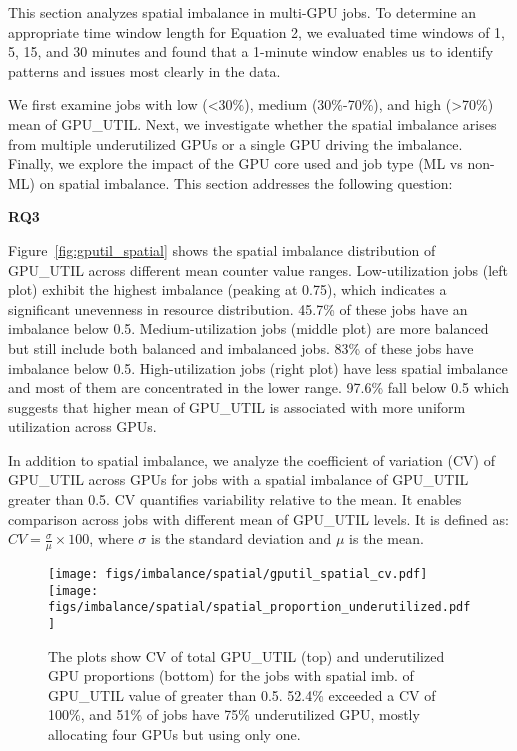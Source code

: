 This section analyzes spatial imbalance in multi-GPU jobs.
To determine an appropriate time window length for Equation 2, we evaluated
time windows of 1, 5, 15, and 30 minutes and found that a 1-minute window
enables us to identify patterns and issues most clearly in the data.

We first examine jobs with low (\textless30\%), medium (30\%-70\%), and
high (\textgreater70\%) mean of GPU\_UTIL. Next, we investigate
whether the spatial imbalance arises from multiple underutilized GPUs or a
single GPU driving the imbalance. Finally, we explore the impact of the GPU core used
and job type (ML vs non-ML) on spatial imbalance. This section addresses
the following question:
%
\begin{RQcallout}
    {\bf RQ3 }{\it \RQthree{}}
\end{RQcallout}

Figure~\ref{fig:gputil_spatial} shows the spatial imbalance distribution of
GPU\_UTIL across different mean counter value ranges. Low-utilization jobs
(left plot) exhibit the highest imbalance (peaking at 0.75),
which indicates a significant unevenness in resource distribution. 45.7\% of these
jobs have an imbalance below 0.5. Medium-utilization jobs (middle plot)  are more
balanced but still include both balanced and imbalanced jobs. 83\% of these jobs have
imbalance below 0.5. High-utilization jobs (right plot) have less spatial imbalance
and most of them are concentrated in the lower range. 97.6\% fall below 0.5 which
suggests that higher mean of GPU\_UTIL is associated with more uniform utilization
across GPUs.

In addition to spatial imbalance, we analyze the coefficient of variation (CV)
of GPU\_UTIL across GPUs for jobs with a spatial imbalance of GPU\_UTIL greater
than 0.5. CV quantifies variability relative to the mean. It enables comparison
across jobs with different mean of GPU\_UTIL levels. It is defined as:
$
    \mathit{CV} = \frac{\sigma}{\mu}\times 100
$, where $\sigma$ is the standard deviation and $\mu$ is the mean.

\begin{figure}[h]
    \centering
    \texttt{[image: figs/imbalance/spatial/gputil\_spatial\_cv.pdf]}
    \texttt{[image: figs/imbalance/spatial/spatial\_proportion\_underutilized.pdf]}
    \caption{
        The plots show CV of total GPU\_UTIL (top) and underutilized
        GPU proportions (bottom) for the jobs with spatial imb. of GPU\_UTIL value
        of greater than 0.5. 52.4\% exceeded a CV of 100\%, and 51\% of jobs have
        75\% underutilized GPU, mostly allocating four GPUs but using only one.}
    \label{fig:spatial_extra}
\end{figure}

